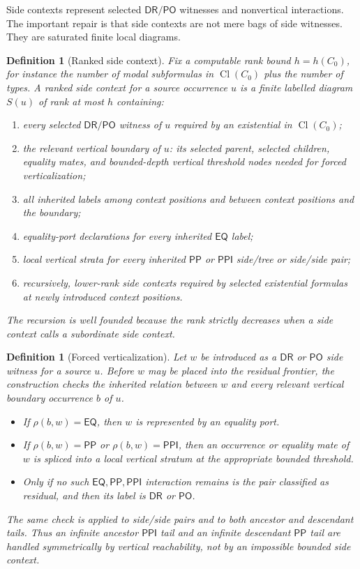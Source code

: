 \documentclass[11pt]{article}
\newtheorem{definition}[theorem]{Definition}
\newcommand{\EQ}{\mathsf{EQ}}
\newcommand{\PP}{\mathsf{PP}}
\newcommand{\PPI}{\mathsf{PPI}}
\newcommand{\PO}{\mathsf{PO}}
\newcommand{\DR}{\mathsf{DR}}
\newcommand{\Cl}{\operatorname{Cl}}
\begin{document}
Side contexts represent selected $\DR/\PO$ witnesses and nonvertical interactions.  The important repair is that side contexts are not mere bags of side witnesses.  They are saturated finite local diagrams.

\begin{definition}[Ranked side context]
Fix a computable rank bound $h=h(C_0)$, for instance the number of modal subformulas in $\Cl(C_0)$ plus the number of types.  A ranked side context for a source occurrence $u$ is a finite labelled diagram $S(u)$ of rank at most $h$ containing:
\begin{enumerate}[label=(S\arabic*)]
\item every selected $\DR/\PO$ witness of $u$ required by an existential in $\Cl(C_0)$;
\item the relevant vertical boundary of $u$: its selected parent, selected children, equality mates, and bounded-depth vertical threshold nodes needed for forced verticalization;
\item all inherited labels among context positions and between context positions and the boundary;
\item equality-port declarations for every inherited $\EQ$ label;
\item local vertical strata for every inherited $\PP$ or $\PPI$ side/tree or side/side pair;
\item recursively, lower-rank side contexts required by selected existential formulas at newly introduced context positions.
\end{enumerate}
The recursion is well founded because the rank strictly decreases when a side context calls a subordinate side context.
\end{definition}

\begin{definition}[Forced verticalization]
Let $w$ be introduced as a $\DR$ or $\PO$ side witness for a source $u$.  Before $w$ may be placed into the residual frontier, the construction checks the inherited relation between $w$ and every relevant vertical boundary occurrence $b$ of $u$.
\begin{itemize}
\item If $\rho(b,w)=\EQ$, then $w$ is represented by an equality port.
\item If $\rho(b,w)=\PP$ or $\rho(b,w)=\PPI$, then an occurrence or equality mate of $w$ is spliced into a local vertical stratum at the appropriate bounded threshold.
\item Only if no such $\EQ,\PP,\PPI$ interaction remains is the pair classified as residual, and then its label is $\DR$ or $\PO$.
\end{itemize}
The same check is applied to side/side pairs and to both ancestor and descendant tails.  Thus an infinite ancestor $\PPI$ tail and an infinite descendant $\PP$ tail are handled symmetrically by vertical reachability, not by an impossible bounded side context.
\end{definition}
\end{document}
